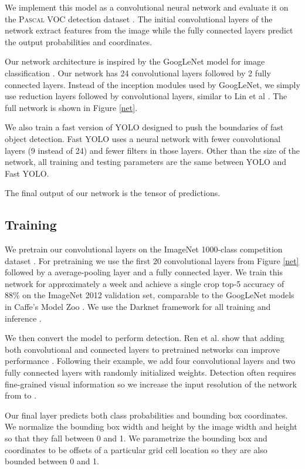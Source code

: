 \documentclass[10pt,twocolumn,letterpaper]{article}
\begin{document}
We implement this model as a convolutional neural network and evaluate it on the \textsc{Pascal} VOC detection dataset \cite{Everingham15}. The initial convolutional layers of the network extract features from the image while the fully connected layers predict the output probabilities and coordinates.

Our network architecture is inspired by the GoogLeNet model for image classification \cite{DBLP:journals/corr/SzegedyLJSRAEVR14}. Our network has 24 convolutional layers followed by 2 fully connected layers. Instead of the inception modules used by GoogLeNet, we simply use  reduction layers followed by  convolutional layers, similar to Lin et al \cite{DBLP:journals/corr/LinCY13}. The full network is shown in Figure \ref{net}.

We also train a fast version of YOLO designed to push the boundaries of fast object detection. Fast YOLO uses a neural network with fewer convolutional layers (9 instead of 24) and fewer filters in those layers. Other than the size of the network, all training and testing parameters are the same between YOLO and Fast YOLO.

The final output of our network is the  tensor of predictions.

\subsection{Training}


We pretrain our convolutional layers on the ImageNet 1000-class competition dataset \cite{ILSVRC15}. For pretraining we use the first 20 convolutional layers from Figure \ref{net} followed by a average-pooling layer and a fully connected layer. We train this network for approximately a week and achieve a single crop top-5 accuracy of 88\% on the ImageNet 2012 validation set, comparable to the GoogLeNet models in Caffe's Model Zoo \cite{zoo}. We use the Darknet framework for all training and inference \cite{darknet13}.

We then convert the model to perform detection. Ren et al. show that adding both convolutional and connected layers to pretrained networks can improve performance \cite{DBLP:journals/corr/RenHGZ015}. Following their example, we add four convolutional layers and two fully connected layers with randomly initialized weights. Detection often requires fine-grained visual information so we increase the input resolution of the network from  to .

Our final layer predicts both class probabilities and bounding box coordinates. We normalize the bounding box width and height by the image width and height so that they fall between 0 and 1. We parametrize the bounding box  and  coordinates to be offsets of a particular grid cell location so they are also bounded between 0 and 1.
\end{document}
